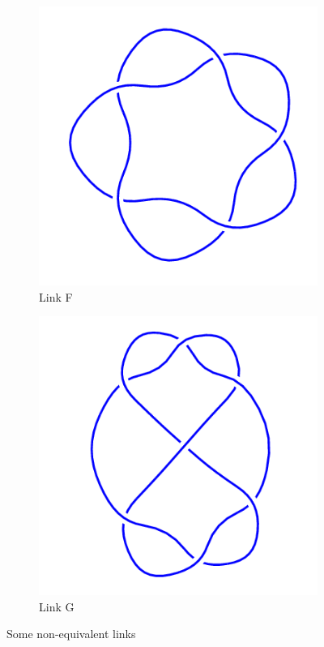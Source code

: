 \documentclass[12pt,letterpaper]{article}
\theoremstyle{definition}
\begin{document}
\begin{figure}[h!]
    \begin{subfigure}{.4\textwidth}
        \centering
        \includegraphics[width=\textwidth]{rgp12pics/5_1.png}
        \caption{Link F}
    \end{subfigure}
    \hspace{.5cm}
    \begin{subfigure}{.4\textwidth}
        \centering
        \includegraphics[width=\textwidth]{rgp08pics/7_4.png}
        \caption{Link G}
    \end{subfigure}
    \caption{Some non-equivalent links}
\end{figure}



\clearpage
\end{document}
